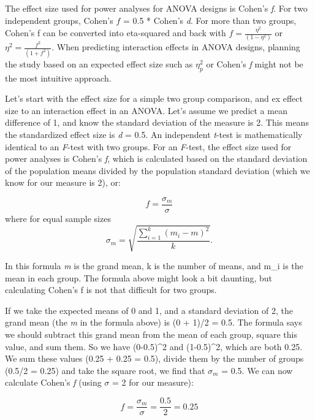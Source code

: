 \documentclass[
  oneside]{book}
\begin{document}
The effect size used for power analyses for ANOVA designs is Cohen's \emph{f}. For two independent groups, Cohen's \(f\) = 0.5 * Cohen's \emph{d}. For more than two groups, Cohen's f can be converted into eta-squared and back with \(f = \frac{\eta^2}{(1 - \eta^2)}\) or \(\eta^2 = \frac{f^2}{(1 + f^2)}\). When predicting interaction effects in ANOVA designs, planning the study based on an expected effect size such as \(\eta_{p}^{2}\) or Cohen's \emph{f} might not be the most intuitive approach.

Let's start with the effect size for a simple two group comparison, and ex effect size to an interaction effect in an ANOVA. Let's assume we predict a mean difference of 1, and know the standard deviation of the measure is 2. This means the standardized effect size is \emph{d} = 0.5. An independent \emph{t}-test is mathematically identical to an \emph{F}-test with two groups. For an \emph{F}-test, the effect size used for power analyses is Cohen's \emph{f}, which is calculated based on the standard deviation of the population means divided by the population standard deviation (which we know for our measure is 2), or:

\begin{equation}
f = \frac{\sigma _{ m }}{\sigma}
\end{equation}
where for equal sample sizes
\begin{equation}
\sigma _{ m } = \sqrt { \frac { \sum_ { i = 1 } ^ { k } ( m _ { i } - m ) ^ { 2 } } { k } }.
\end{equation}

In this formula \emph{m} is the grand mean, k is the number of means, and m\_i is the mean in each group. The formula above might look a bit daunting, but calculating Cohen's f is not that difficult for two groups.

If we take the expected means of 0 and 1, and a standard deviation of 2, the grand mean (the \emph{m} in the formula above) is (0 + 1)/2 = 0.5. The formula says we should subtract this grand mean from the mean of each group, square this value, and sum them. So we have (0-0.5)\^{}2 and (1-0.5)\^{}2, which are both 0.25. We sum these values (0.25 + 0.25 = 0.5), divide them by the number of groups (0.5/2 = 0.25) and take the square root, we find that \(\sigma_{ m }\) = 0.5. We can now calculate Cohen's \emph{f} (using \(\sigma\) = 2 for our measure):

\begin{equation}
f = \frac{\sigma _{ m }}{\sigma} = \frac{0.5}{2} = 0.25
\end{equation}
\end{document}
